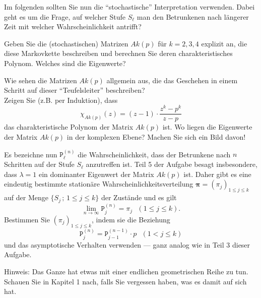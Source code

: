 Im folgenden sollten Sie nun die ``stochastische'' Interpretation verwenden.
Dabei geht es um die Frage, auf welcher Stufe $S_\ell$ man den Betrunkenen nach
längerer Zeit mit welcher Wahrscheinlichkeit antrifft?

\begin{flushenum}
\setcounter{itemcounter}{3}
\item Geben Sie die (stochastischen) Matrizen $Ak(p)$ für $k=2,3,4$ explizit
	an, die diese Markovkette beschreiben und berechnen Sie deren
	charakteristisches Polynom.  Welches sind die Eigenwerte?
\item Wie sehen die Matrizen $Ak(p)$ allgemein aus, die das Geschehen in einem
	Schritt auf dieser ``Teufelsleiter''  beschreiben?\\ Zeigen Sie (z.B.
	per Induktion), dass
	\[
	\chi_{Ak(p)}(z) = (z-1) \cdot \frac{z^k-p^k}{z-p}
	\]
	das charakteristische Polynom der Matrix $Ak(p)$ ist.  Wo liegen die
	Eigenwerte der Matrix $Ak(p)$ in der komplexen Ebene?  Machen Sie sich
	ein Bild davon!

\item Es bezeichne nun $\mathtt{P}_\ell^{(n)}$ die Wahrscheinlichkeit, dass der
	Betrunkene nach $n$ Schritten auf der Stufe $S_\ell$ anzutreffen ist.
	Teil 5 der Aufgabe besagt insbesondere, dass $\lambda=1$ ein dominanter
	Eigenwert der Matrix $Ak(p)$ ist.
	Daher gibt es eine eindeutig bestimmte stationäre
	Wahrscheinlichkeitsverteilung $\boldsymbol{\pi}=(\pi_j)_{1 \leq j \leq
	k}$ auf der Menge $\{S_j\,;\, 1 \leq j \leq k\}$  der Zustände und es
	gilt
	\[
	\lim_{n \rightarrow \infty} \mathtt{P}_j^{(n)} = \pi_j ~~~(1 \leq j \leq k).
	\]
	Bestimmen Sie $(\pi_j)_{1 \leq j \leq k}$, indem sie die Beziehung
	\[
	\mathtt{P}_j^{(n)} = \mathtt{P}_{j-1}^{(n-1)} \cdot p~~~(1<j\leq k)
	\]
	und das asymptotische Verhalten verwenden --- ganz analog wie in Teil 3
	dieser Aufgabe.
\end{flushenum}

Hinweis: Das Ganze hat etwas mit einer endlichen geometrischen Reihe zu tun.
Schauen Sie in Kapitel 1 nach, falls Sie vergessen haben, was es damit auf sich
hat.
